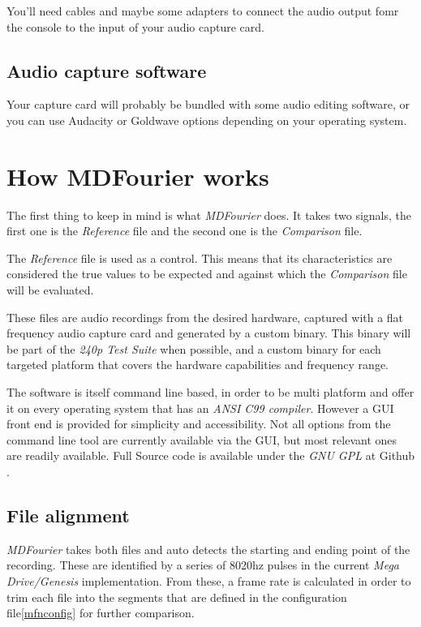 \documentclass[10pt,a4paper]{report}
\begin{document}
You'll need cables and maybe some adapters to connect the audio output fomr the console to the input of your audio capture card.

\section{Audio capture software}

Your capture card will probably be bundled with some audio editing software, or you can use  Audacity\cite{audacity} or Goldwave\cite{goldwave} options depending on your operating system.

\chapter{How MDFourier works}
\label{howitworks}

The first thing to keep in mind is what \textit{MDFourier} does. It takes two signals, the first one is the \textit{Reference} file and the second one is the \textit{Comparison} file.

The \textit{Reference} file is used as a control. This means that its characteristics are considered the true values to be expected and against which the \textit{Comparison} file will be evaluated.

These files are audio recordings from the desired hardware, captured with a flat frequency audio capture card and generated by a custom binary. This binary will be part of the \textit{240p Test Suite}\cite{240pSuite} when possible, and a custom binary for each targeted platform that covers the hardware capabilities and frequency range.

The software is itself command line based, in order to be multi platform and offer it on every operating system that has an \textit{ANSI C99 compiler}. However a GUI front end is provided for simplicity and accessibility. Not all options from the command line tool are currently available via the GUI, but most relevant ones are readily available. Full Source code is available under the \textit{GNU GPL} at Github \cite{sourcecode}.

\section{File alignment}

\textit{MDFourier} takes both files and auto detects the starting and ending point of the recording. These are identified by a series of 8020hz pulses in the current \textit{Mega Drive/Genesis} implementation. From these, a frame rate is calculated in order to trim each file into the segments that are defined in the configuration file\ref{mfnconfig} for further comparison.
\end{document}
